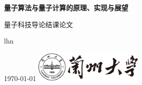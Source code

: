 \documentclass[a4paper,zihao=-4,linespread=1]{ctexart}
\begin{document}
\begin{titlepage}
    \centering  %
    \vspace*{5cm}  %

    \textbf{\LARGE 量子算法与量子计算的原理、实现与展望}  %

    \vspace{1cm}  %
    \large 量子科技导论结课论文  %
    
    \vspace{8cm}  %

    \large lhn %

    \vspace{0.5cm}  %
    \large \today  %
    \vfill   %
    \includegraphics[width=0.4\textwidth]{figures/lzu2020.png}  %


\end{titlepage}

\thispagestyle{empty}  %
\setcounter{page}{0}

\thispagestyle{empty}
\setcounter{page}{0}

\tableofcontents  %
\setcounter{page}{0}





\appendix %



\nocite{*} %
\end{document}
